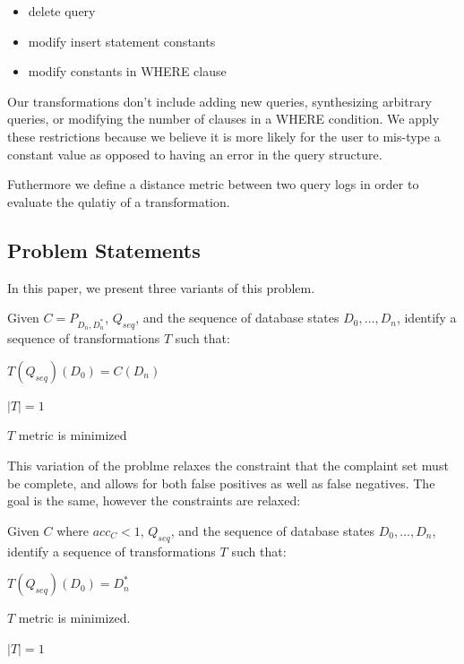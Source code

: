 \begin{itemize}
\item delete query
\item modify insert statement constants
\item modify constants in WHERE clause
\end{itemize}

Our transformations don't include adding new queries, synthesizing arbitrary queries, or modifying the
number of clauses in a WHERE condition.  We apply these restrictions because we believe it is more likely
for the user to mis-type a constant value as opposed to having an error in the query structure.

Futhermore we define a distance metric between two query logs in order to evaluate
the qulatiy of a transformation.



\subsection{Problem Statements}

In this paper, we present three variants of this problem.

\begin{problem}\label{prob:complete}
Given $C = P_{D_n, D^*_n}$, $Q_{seq}$, and the sequence of database states $D_0,\ldots,D_n$, 
identify a sequence of transformations $T$ such that:
\begin{CompactItemize}
\item $T(Q_{seq})(D_0) = C(D_n)$
\item $|T| = 1$
\item $T$ metric is minimized
\end{CompactItemize}
\end{problem}

This variation of the problme relaxes the constraint that the complaint set must be complete, and allows
for both false positives as well as false negatives.  The goal is the same, however the constraints are relaxed:

\begin{problem}\label{prob:incomplete}
Given $C$ where $acc_C < 1$, $Q_{seq}$, and the sequence of database states $D_0,\ldots,D_n$, 
identify a sequence of transformations $T$ such that:
\begin{CompactItemize}
\item $T(Q_{seq})(D_0) = D^*_n$
\item $T$ metric is minimized.
\item $|T| = 1$
\end{CompactItemize}
\end{problem}


